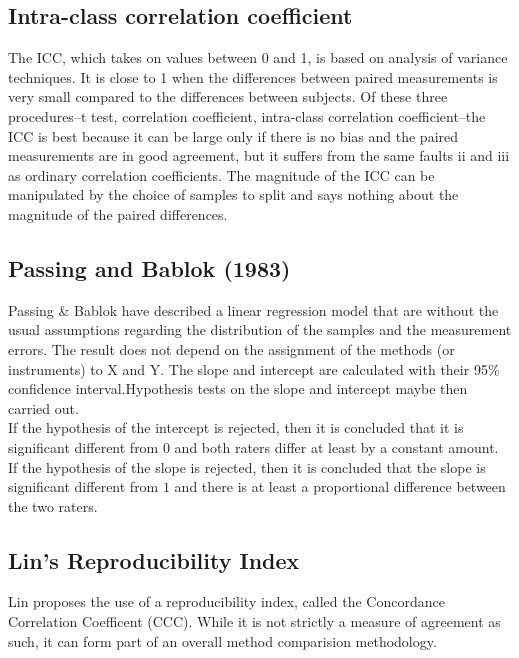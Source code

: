 \documentclass[12pt, a4paper]{report}
\theoremstyle{plain}
\theoremstyle{definition}
\theoremstyle{remark}
\begin{document}
	
	\subsection*{Intra-class correlation coefficient}
	
	The ICC, which takes on values between 0 and 1, is based on analysis of variance techniques. It is close to 1 when the differences between paired measurements is very small compared to the differences between subjects. Of these three procedures--t test, correlation coefficient, intra-class correlation coefficient--the ICC is best because it can be large only if there is no bias and the paired measurements are in good agreement, but it suffers from the same faults ii and iii as ordinary correlation coefficients. The magnitude of the ICC can be manipulated by the choice of samples to split and says nothing about the magnitude of the paired differences.
	
	
	
	
	
	
	\subsection{Passing and Bablok (1983) }
	Passing \& Bablok have described a linear regression model that
	are without the usual assumptions regarding the distribution of
	the samples and the measurement errors. The result does not depend
	on the assignment of the methods (or instruments) to X and Y. The
	slope and intercept  are calculated with their 95\% confidence
	interval.Hypothesis tests on the slope and intercept maybe then
	carried out.
	\\
	If the hypothesis of the intercept is rejected, then it is
	concluded that it is significant different from $0$ and both
	raters differ at least by a constant amount.
	\\
	If the hypothesis of the slope is rejected, then it is concluded
	that the slope is significant different from $1$ and there is at
	least a proportional difference between the two raters.
	
	\subsection{Lin's Reproducibility Index} Lin proposes the use of a
	reproducibility index, called the Concordance Correlation
	Coefficent (CCC). While it is not strictly a measure of agreement
	as such, it can form part of an overall method comparision
	methodology.
\end{document}
